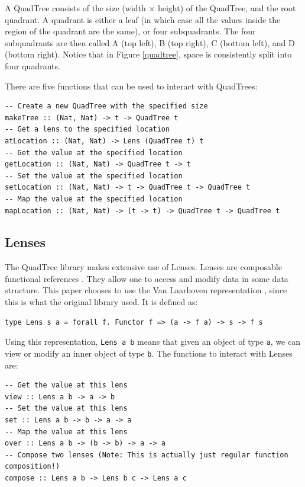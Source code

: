 A QuadTree consists of the size (width  ×  height) of the QuadTree, and the root quadrant. A quadrant is either a leaf (in which case all the values inside the region of the quadrant are the same), or four subquadrants. The four subquadrants are then called A (top left), B (top right), C (bottom left), and D (bottom right). Notice that in Figure \ref{quadtree}, space is consistently split into four quadrants.

There are five functions that can be used to interact with QuadTrees:
\begin{verbatim}
-- Create a new QuadTree with the specified size
makeTree :: (Nat, Nat) -> t -> QuadTree t
-- Get a lens to the specified location
atLocation :: (Nat, Nat) -> Lens (QuadTree t) t
-- Get the value at the specified location
getLocation :: (Nat, Nat) -> QuadTree t -> t
-- Set the value at the specified location
setLocation :: (Nat, Nat) -> t -> QuadTree t -> QuadTree t
-- Map the value at the specified location
mapLocation :: (Nat, Nat) -> (t -> t) -> QuadTree t -> QuadTree t
\end{verbatim}

\subsection{Lenses}
The QuadTree library makes extensive use of Lenses. Lenses are composable functional references \cite{lens}. They allow one to access and modify data in some data structure. This paper chooses to use the Van Laarhoven representation \cite{laarhovenlens}, since this is what the original library used. It is defined as:
\begin{verbatim}
type Lens s a = forall f. Functor f => (a -> f a) -> s -> f s
\end{verbatim}
Using this representation, \verb|Lens a b| means that given an object of type \verb|a|, we can view or modify an inner object of type \verb|b|.
The functions to interact with Lenses are:
\begin{verbatim}
-- Get the value at this lens
view :: Lens a b -> a -> b
-- Set the value at this lens
set :: Lens a b -> b -> a -> a
-- Map the value at this lens
over :: Lens a b -> (b -> b) -> a -> a
-- Compose two lenses (Note: This is actually just regular function composition!)
compose :: Lens a b -> Lens b c -> Lens a c
\end{verbatim}